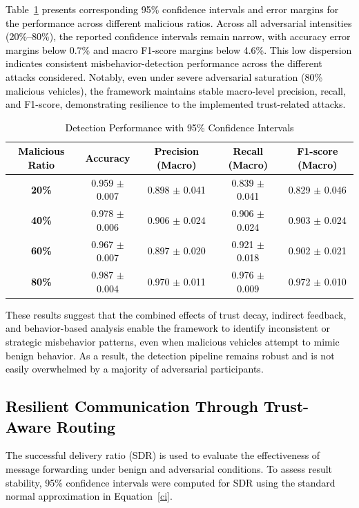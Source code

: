 \cite{cho2010survey}\documentclass[journal,comsoc,twoside]{IEEEtran}
\begin{document}
\textcolor{black}{
Table~\ref{accuracy} presents corresponding 95\% confidence intervals and error margins for the performance across different malicious ratios. Across all adversarial intensities (20\%–80\%), the reported confidence intervals remain narrow, with accuracy error margins below 0.7\% and macro F1-score margins below 4.6\%. This low dispersion indicates consistent misbehavior-detection performance across the different attacks considered. Notably, even under severe adversarial saturation (80\% malicious vehicles), the framework maintains stable macro-level precision, recall, and F1-score, demonstrating resilience to the implemented trust-related attacks.
}

\begin{table}[!htbp]
\centering
\textcolor{black}{
\caption{Detection Performance with 95\% Confidence Intervals}
\label{accuracy}
\begin{tabular}{|c|c|c|c|c|}
\hline
\textbf{Malicious Ratio} & \textbf{Accuracy} & \textbf{Precision (Macro)} & \textbf{Recall (Macro)} & \textbf{F1-score (Macro)} \\ \hline
\textbf{20\%} & 0.959 $\pm$ 0.007 & 0.898 $\pm$ 0.041 & 0.839 $\pm$ 0.041 & 0.829 $\pm$ 0.046 \\ \hline
\textbf{40\%} & 0.978 $\pm$ 0.006 & 0.906 $\pm$ 0.024 & 0.906 $\pm$ 0.024 & 0.903 $\pm$ 0.024 \\ \hline
\textbf{60\%} & 0.967 $\pm$ 0.007 & 0.897 $\pm$ 0.020 & 0.921 $\pm$ 0.018 & 0.902 $\pm$ 0.021 \\ \hline
\textbf{80\%} & 0.987 $\pm$ 0.004 & 0.970 $\pm$ 0.011 & 0.976 $\pm$ 0.009 & 0.972 $\pm$ 0.010 \\ \hline
\end{tabular}
}
\end{table}

\textcolor{black}{
These results suggest that the combined effects of trust decay, indirect feedback, and behavior-based analysis enable the framework to identify inconsistent or strategic misbehavior patterns, even when malicious vehicles attempt to mimic benign behavior. As a result, the detection pipeline remains robust and is not easily overwhelmed by a majority of adversarial participants.
}

\textcolor{black}{
\subsection{Resilient Communication Through Trust-Aware Routing}
The successful delivery ratio (SDR) is used to evaluate the effectiveness of message forwarding under benign and adversarial conditions. To assess result stability, 95\% confidence intervals were computed for SDR using the standard normal approximation in Equation~\ref{ci}.}
\end{document}
